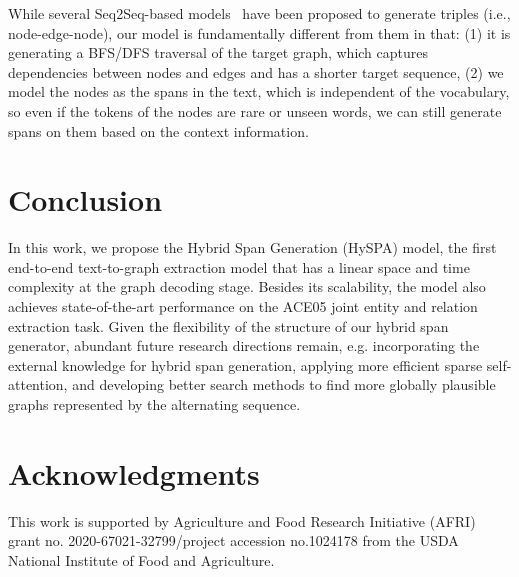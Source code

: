 \documentclass[11pt,a4paper]{article}
\begin{document}
While several Seq2Seq-based models~\cite{seq2umtree, seq2seq_re, seq2seq_re2, seq2seq_re3,zhang-etal-2019-broad} have been proposed to generate triples (i.e., node-edge-node), our model is fundamentally different from them in 
that: (1) it is
generating a BFS/DFS traversal of the target graph, which captures 
dependencies between nodes and edges and has a shorter target sequence, (2) we model the nodes as the spans in the text, which is independent of the vocabulary, so even if the tokens of the nodes are rare or unseen words, we can still generate spans on them based on the context information.








\section{Conclusion}
In this work, we propose the Hybrid Span Generation (HySPA) model, the first end-to-end text-to-graph extraction model that has a linear space and time complexity at the graph decoding stage. Besides its scalability, the model also achieves  state-of-the-art performance on the ACE05 joint entity and relation extraction task. Given the flexibility of the structure of our hybrid span generator, abundant future research directions remain, e.g. incorporating the external knowledge for hybrid span generation, applying more efficient sparse self-attention, and developing better search methods to find more globally plausible graphs represented by the alternating sequence.

\section*{Acknowledgments}
This work is supported by Agriculture and Food Research Initiative (AFRI) grant no. 2020-67021-32799/project accession no.1024178 from the USDA National Institute of Food and Agriculture.



\appendix
\end{document}

